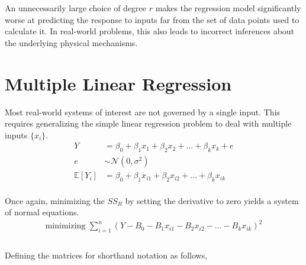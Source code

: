 An unnecessarily large choice of degree $ r $ makes the regression model significantly worse at predicting the response to inputs far from the set of data points used to calculate it. In real-world problems, this also leads to incorrect inferences about the underlying physical mechanisms.\\

\section{Multiple Linear Regression}

Most real-world systems of interest are not governed by a single input. This requires generalizing the simple linear regression problem to deal with multiple inputs $ \{x_i\} $.\\

\begin{align}
	Y &= \beta_0 + \beta_1 x_1 + \beta_2 x_2 + \dots + \beta_k x_k + e \\
	e &\sim \mathcal{N}(0, \sigma^2) \nonumber \\
	\mathbb{E}[Y_i] &= \beta_0 + \beta_1 x_{i1} + \beta_2 x_{i2} + \dots + \beta_k x_{ik} \nonumber
\end{align}\\

Once again, minimizing the $ SS_R $ by setting the derivative to zero yields a system of normal equations.\\

\begin{align}
	\text{minimizing }\sum\limits_{i = 1}^n (Y - B_0 - B_1 x_{i1} - B_2 x_{i2} - \dots - B_k x_{ik})^2 \nonumber \\
\end{align}\\

Defining the matrices for shorthand notation as follows,\\

